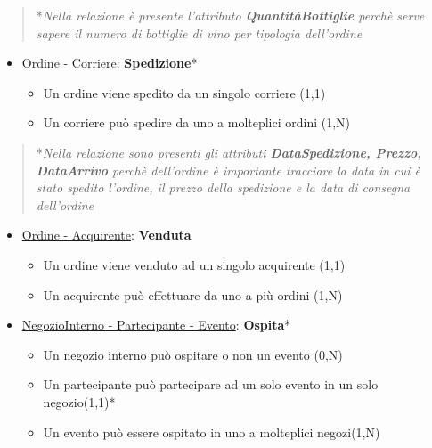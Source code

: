 \begin{verse}
	*\emph{Nella relazione è presente l'attributo \textbf{QuantitàBottiglie} perchè serve sapere il numero di bottiglie di vino per tipologia dell'ordine}
\end{verse}

\begin{itemize}
	\item \underline{Ordine - Corriere}: \textbf{Spedizione}*
	
	\begin{itemize}
		\item Un ordine viene spedito da un singolo corriere (1,1)
		\item Un corriere può spedire da uno a molteplici ordini (1,N)
	\end{itemize}
	
\end{itemize}

\begin{verse}
	*\emph{Nella relazione sono presenti gli attributi \textbf{DataSpedizione, Prezzo, DataArrivo} perchè dell'ordine è importante tracciare la data in cui è stato spedito l'ordine, il prezzo della spedizione e la data di consegna dell'ordine}
\end{verse}

\begin{itemize}
	\item \underline{Ordine - Acquirente}: \textbf{Venduta}
	
	\begin{itemize}
		\item Un ordine viene venduto ad un singolo acquirente (1,1)
		\item Un acquirente può effettuare da uno a più ordini (1,N)
	\end{itemize}
	
\end{itemize}

\begin{itemize}
	\item \underline{NegozioInterno - Partecipante - Evento}: \textbf{Ospita}*
	
	\begin{itemize}
		\item Un negozio interno può ospitare o non un evento (0,N)
		\item Un partecipante può partecipare ad un solo evento in un solo negozio(1,1)*
		\item Un evento può essere ospitato in uno a molteplici negozi(1,N)
	\end{itemize}
	
\end{itemize}

